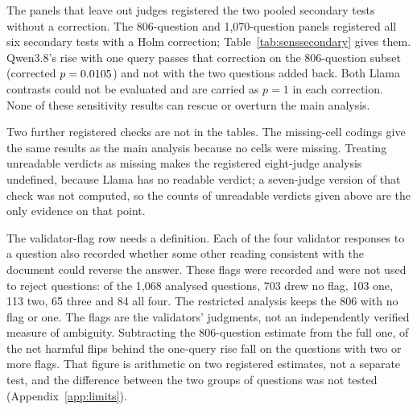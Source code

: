 \begin{table}[h]
\centering
\caption{One-query primary contrasts and pooled secondary contrasts in each sensitivity analysis, in percentage
points, on the scale of the judges that produced data. (The registered scoring counts Llama 3.3 70B as a constant, which shrinks every estimate by a fixed
factor and leaves the $p$-values unchanged.) The $p$-values for the two one-query differences are one-sided; the
joint $p$ is the larger of them, shown before and after the correction for two budgets. The $p$-values for the last
two contrasts are two-sided and not adjusted. ``n/r'': not registered for that analysis.}
\label{tab:senscontrasts}
\scriptsize
\setlength{\tabcolsep}{3pt}

\end{table}

The panels that leave out judges registered the two pooled secondary tests without a correction. The 806-question
and 1,070-question panels registered all six secondary tests with a Holm correction; Table~\ref{tab:senssecondary}
gives them. Qwen3.8's rise with one query passes that correction on the 806-question subset (corrected
$p = 0.0105$) and not with the two questions added back. Both Llama contrasts could not be evaluated and are
carried as $p = 1$ in each correction. None of these sensitivity results can rescue or overturn the main analysis.

\begin{table}[h]
\centering
\caption{Registered secondary contrasts in the two sensitivity panels that registered all six with a Holm
correction, in percentage points. Pooled contrasts are on the scale of the seven judges that produced data. The two
Llama 3.3 70B contrasts in each panel could not be evaluated.}
\label{tab:senssecondary}
\small

\end{table}

Two further registered checks are not in the tables. The missing-cell codings give the same results as the main
analysis because no cells were missing. Treating unreadable verdicts as missing makes the registered eight-judge
analysis undefined, because Llama has no readable verdict; a seven-judge version of that check was not computed, so
the counts of unreadable verdicts given above are the only evidence on that point.

The validator-flag row needs a definition. Each of the four validator responses to a question also recorded whether
some other reading consistent with the document could reverse the answer. These flags were recorded and were not
used to reject questions: of the 1,068 analysed questions, 703 drew no flag, 103 one, 113 two, 65 three and 84 all
four. The restricted analysis keeps the 806 with no flag or one. The flags are the validators' judgments, not an
independently verified measure of ambiguity. Subtracting the 806-question estimate from the full one, \flagNetRise{}
of the \nNetFlips{} net harmful flips behind the one-query rise fall on the \nFlaggedTwoPlus{} questions with two or
more flags. That figure is arithmetic on two registered estimates, not a separate test, and the difference between
the two groups of questions was not tested (Appendix~\ref{app:limits}).

